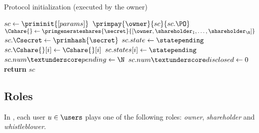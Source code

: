 \begin{algorithm}[t]
	\caption{Protocol initialization (executed by the owner)}\label{algo:init}
	\begin{algorithmic}[1]
		\vspace{0.6em}
		
		\State $sc\gets \priminit{[params]}$
		\State $\primpay{\owner}{sc}{sc.\PO}$ 
		\State $\Cshare{} \gets \primgenerateshares{\secret}{[\owner, \shareholder_{1}, \ldots, \shareholder_{\N}]}$
		\State $sc.\Csecret\gets \primhash{\secret}$ 
		\State $sc.state\gets \statepending$
		 
		\State $sc.\Cshare{}[i]\gets \Cshare{}[i]$
		\State $sc.states[i]\gets \statepending$
		\EndFor
		\State $sc.num\textunderscore pending\gets \N$
		\State $sc.num\textunderscore disclosed\gets 0$
		\State \textbf{return} $sc$
		\EndProcedure	
	\end{algorithmic}
\end{algorithm}


\subsection{Roles}


%
In \shortname, each user $u \in \users$ plays one of the following roles: {\em owner}, {\em shareholder} and {\em whistleblower}.

